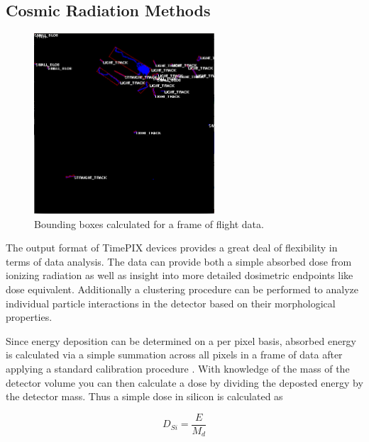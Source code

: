 \subsection{Cosmic Radiation Methods}
\label{sec:Rad-Methods}

\begin{figure}[H]
	\begin{center}
	\includegraphics[width=0.6\textwidth]{figures/clustering.png}
	\caption{Bounding boxes calculated for a frame of flight data.}
	\label{clusterframe}
	\end{center}
\end{figure}

The output format of TimePIX devices provides a great deal of flexibility in terms of data analysis. The data can provide both a simple absorbed dose from ionizing radiation as well as insight into more detailed dosimetric endpoints like dose equivalent. Additionally a clustering procedure can be performed to analyze individual particle interactions in the detector based on their morphological properties.

 Since energy deposition can be determined on a per pixel basis, absorbed energy is calculated via a simple summation across all pixels in a frame of data after applying a standard calibration procedure \cite{mpjakubek}. With knowledge of the mass of the detector volume you can then calculate a dose by dividing the deposted energy by the detector mass. Thus a simple dose in silicon is calculated as



\[D_{Si} = \frac{E}{M_{d}}\]



